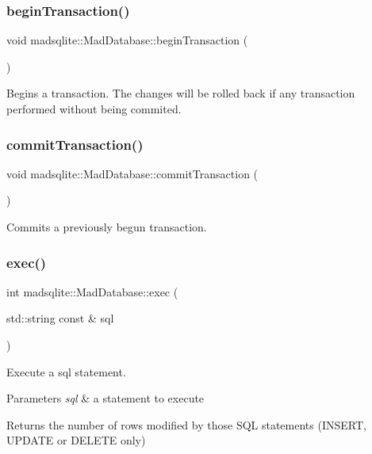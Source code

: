 \subsubsection{\texorpdfstring{begin\+Transaction()}{beginTransaction()}}
{\footnotesize\ttfamily void madsqlite\+::\+Mad\+Database\+::begin\+Transaction (\begin{DoxyParamCaption}{ }\end{DoxyParamCaption})}

Begins a transaction. The changes will be rolled back if any transaction performed without being commited. \hypertarget{classmadsqlite_1_1_mad_database_a438b3c7393a84de57b638db06d84bd7b}{}\label{classmadsqlite_1_1_mad_database_a438b3c7393a84de57b638db06d84bd7b} 
\subsubsection{\texorpdfstring{commit\+Transaction()}{commitTransaction()}}
{\footnotesize\ttfamily void madsqlite\+::\+Mad\+Database\+::commit\+Transaction (\begin{DoxyParamCaption}{ }\end{DoxyParamCaption})}

Commits a previously begun transaction. \hypertarget{classmadsqlite_1_1_mad_database_adba4c69666317dcdf14cd3a1eb6260dd}{}\label{classmadsqlite_1_1_mad_database_adba4c69666317dcdf14cd3a1eb6260dd} 
\subsubsection{\texorpdfstring{exec()}{exec()}}
{\footnotesize\ttfamily int madsqlite\+::\+Mad\+Database\+::exec (\begin{DoxyParamCaption}\item[{std\+::string const \&}]{sql }\end{DoxyParamCaption})}

Execute a sql statement.


\begin{DoxyParams}{Parameters}
{\em sql} & a statement to execute \\
\hline
\end{DoxyParams}
\begin{DoxyReturn}{Returns}
the number of rows modified by those S\+QL statements (I\+N\+S\+E\+RT, U\+P\+D\+A\+TE or D\+E\+L\+E\+TE only) 
\end{DoxyReturn}
\hypertarget{classmadsqlite_1_1_mad_database_ad70e43249370cd4a04183f3f98751b4e}{}\label{classmadsqlite_1_1_mad_database_ad70e43249370cd4a04183f3f98751b4e} 
